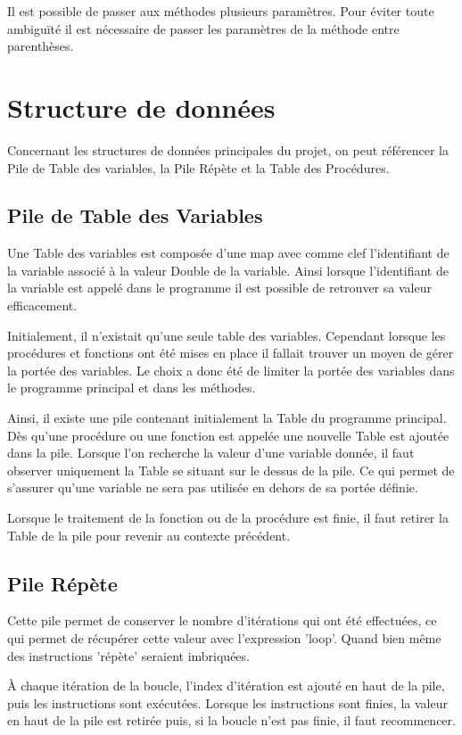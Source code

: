 \documentclass[a4paper,11pt]{article}
\begin{document}
Il est possible de passer aux méthodes plusieurs paramètres. Pour éviter toute ambiguïté il est nécessaire de passer les paramètres de la méthode entre parenthèses.  




\section{Structure de données}
Concernant les structures de données principales du projet, on peut référencer la Pile de Table des variables, la Pile Répète et la Table des Procédures.

\subsection{Pile de Table des Variables}
Une Table des variables est composée d'une map avec comme clef l'identifiant de la variable associé à la valeur Double de la variable. Ainsi lorsque l'identifiant de la variable est appelé dans le programme il est possible de retrouver sa valeur efficacement.

Initialement, il n'existait qu'une seule table des variables. Cependant lorsque les procédures et fonctions ont été mises en place il fallait trouver un moyen de gérer la portée des variables.
Le choix a donc été de limiter la portée des variables dans le programme principal et dans les méthodes. 

Ainsi, il existe une pile contenant initialement la Table du programme principal. Dès qu'une procédure ou une fonction est appelée une nouvelle Table est ajoutée dans la pile.
Lorsque l'on recherche la valeur d'une variable donnée, il faut observer uniquement la Table se situant sur le dessus de la pile. Ce qui permet de s'assurer qu'une variable ne sera pas utilisée en dehors de sa portée définie.

Lorsque le traitement de la fonction ou de la procédure est finie, il faut retirer la Table de la pile pour revenir au contexte précédent.


\subsection{Pile Répète}
Cette pile permet de conserver le nombre d'itérations qui ont été effectuées, ce qui permet de récupérer cette valeur avec l'expression 'loop'. Quand bien même des instructions 'répète' seraient imbriquées.

À chaque itération de la boucle, l'index d'itération est ajouté en haut de la pile, puis les instructions sont exécutées. Lorsque les instructions sont finies, la valeur en haut de la pile est retirée puis, si la boucle n'est pas finie, il faut recommencer. 
\end{document}
